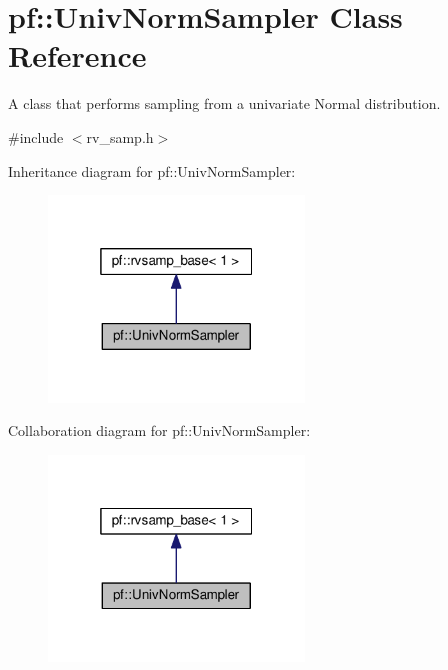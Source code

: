 \hypertarget{classpf_1_1UnivNormSampler}{}\section{pf\+:\+:Univ\+Norm\+Sampler Class Reference}
\label{classpf_1_1UnivNormSampler}


A class that performs sampling from a univariate Normal distribution.  




{\ttfamily \#include $<$rv\+\_\+samp.\+h$>$}



Inheritance diagram for pf\+:\+:Univ\+Norm\+Sampler\+:\nopagebreak
\begin{figure}[H]
\begin{center}
\leavevmode
\includegraphics[width=193pt]{classpf_1_1UnivNormSampler__inherit__graph}
\end{center}
\end{figure}


Collaboration diagram for pf\+:\+:Univ\+Norm\+Sampler\+:\nopagebreak
\begin{figure}[H]
\begin{center}
\leavevmode
\includegraphics[width=193pt]{classpf_1_1UnivNormSampler__coll__graph}
\end{center}
\end{figure}
